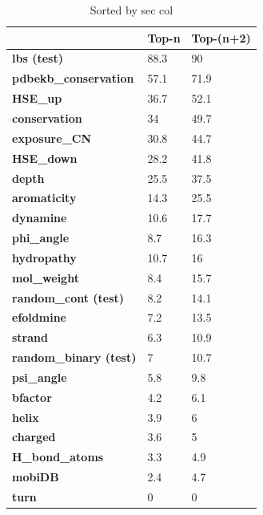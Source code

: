 \begin{table}[]
\centering
\begin{tabular}{lll}
\hline
                              & Top-n & Top-(n+2) \\ \hline
\textbf{lbs (test)}                  & 88.3  & 90        \\
\textbf{pdbekb\_conservation} & 57.1  & 71.9      \\
\textbf{HSE\_up}              & 36.7  & 52.1      \\
\textbf{conservation}         & 34    & 49.7      \\
\textbf{exposure\_CN}         & 30.8  & 44.7      \\
\textbf{HSE\_down}            & 28.2  & 41.8      \\
\textbf{depth}                & 25.5  & 37.5      \\
\textbf{aromaticity}          & 14.3  & 25.5      \\
\textbf{dynamine}             & 10.6  & 17.7      \\
\textbf{phi\_angle}           & 8.7   & 16.3      \\
\textbf{hydropathy}           & 10.7  & 16        \\
\textbf{mol\_weight}          & 8.4   & 15.7      \\
\textbf{random\_cont (test)}         & 8.2   & 14.1      \\
\textbf{efoldmine}            & 7.2   & 13.5      \\
\textbf{strand}               & 6.3   & 10.9      \\
\textbf{random\_binary (test)}       & 7     & 10.7      \\
\textbf{psi\_angle}           & 5.8   & 9.8       \\
\textbf{bfactor}              & 4.2   & 6.1       \\
\textbf{helix}                & 3.9   & 6         \\
\textbf{charged}              & 3.6   & 5         \\
\textbf{H\_bond\_atoms}       & 3.3   & 4.9       \\
\textbf{mobiDB}               & 2.4   & 4.7       \\
\textbf{turn}                 & 0     & 0         \\ \hline
\end{tabular}
\caption{Sorted by sec col}
\label{tab:p2rankCSVOne}
\end{table}

